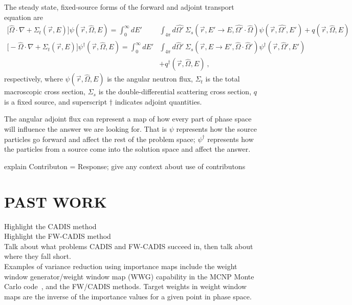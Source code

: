 \documentclass[12pt]{article}
\newcommand{\Macro}{\ensuremath{\Sigma}}
\newcommand{\vOmega}{\ensuremath{\hat{\Omega}}}
\newcommand{\rvec}{\ensuremath{\vec{r}}}
\begin{document}
The steady state, fixed-source forms of the forward and adjoint transport equation are
\begin{align*}
\bigl[\hat{\Omega} \cdot \nabla + \Macro_t(\vec{r}, E)\bigr] \psi(\vec{r}, \hat{\Omega}, E)  =  \int_0^{\infty} dE' &\int_{4\pi} d\hat{\Omega'} \:\Macro_{s}(\vec{r}, E' \to E, \hat{\Omega'} \cdot \hat{\Omega}) \psi(\vec{r}, \hat{\Omega'}, E') + q(\vec{r}, \vOmega, E)\\
%
\bigl[-\vOmega \cdot \nabla + \Sigma_t(\rvec, E)\bigr] \psi^{\dagger}(\vec{r}, \vOmega, E) = \int_0^{\infty} dE' &\int_{4\pi} d\vOmega' \: \Sigma_s(\rvec, E \rightarrow E', \vOmega \cdot \vOmega') \psi^{\dagger}(\rvec, \vOmega', E') \\
&+ q^{\dagger}(\vec{r}, \vOmega, E)\:,
\end{align*}
respectively, where $\psi(\vec{r}, \hat{\Omega}, E)$ is the angular neutron flux, $\Sigma_t$ is the total macroscopic cross section, $\Sigma_s$ is the double-differential scattering cross section, $q$ is a fixed source, and superscript $\dagger$ indicates adjoint quantities. 

The angular adjoint flux can represent a map of how every part of phase space will influence the answer we are looking for.
That is $\psi$ represents how the source particles go forward and affect the rest of the problem space; $\psi^{\dagger}$ represents how the particles from a source come into the solution space and affect the answer. 

explain Contributon = Response; give any context about use of contributons \\

\section{PAST WORK}
\label{sect::past}
Highlight the CADIS method \\
Highlight the FW-CADIS method \\
Talk about what problems CADIS and FW-CADIS succeed in, then talk about where they fall short. \\

Examples of variance reduction using importance maps include the weight window generator/weight window map (WWG) capability in the MCNP Monte Carlo code~\cite{brown_mcnp_2002}, and the FW/CADIS methods. Target weights in weight window maps are the inverse of the importance values for a given point in phase space.
\end{document}
